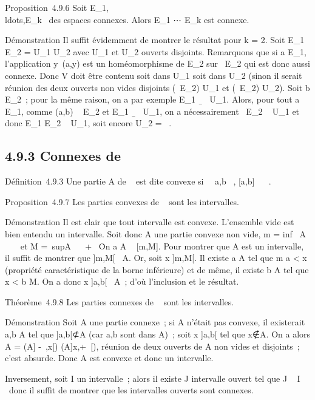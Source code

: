 \documentclass[]{article}
\begin{document}
Proposition~4.9.6 Soit
E_1,\\ldots,E_k~
des espaces connexes. Alors E_1 \times⋯ \times
E_k est connexe.

Démonstration Il suffit évidemment de montrer le résultat pour k = 2.
Soit E_1 \times E_2 = U_1 \cup U_2 avec
U_1 et U_2 ouverts disjoints. Remarquons que si a \in
E_1, l'application y\mapsto~(a,y) est un
homéomorphisme de E_2 sur \a\
\times E_2 qui est donc aussi connexe. Donc V doit être contenu soit
dans U_1 soit dans U_2 (sinon il serait réunion des
deux ouverts non vides disjoints (\a\
\times E_2) \bigcap U_1 et (\a\
\times E_2) \bigcap U_2). Soit b \in E_2~; pour la même
raison, on a par exemple E_1
\times\b\ \subset~ U_1. Alors, pour tout
a \in E_1, comme (a,b) \in\a\ \times
E_2 et E_1 \times\b\ \subset~
U_1, on a nécessairement \a\
\times E_2 \subset~ U_1 et donc E_1 \times E_2 \subset~
U_1, soit encore U_2 = \varnothing~.

\subsection{4.9.3 Connexes de ~}

Définition~4.9.3 Une partie A de ~ est dite convexe si
\forall~~a,b \in {}~, [a,b] \subset~ ~.

Proposition~4.9.7 Les parties convexes de ~ sont les intervalles.

Démonstration Il est clair que tout intervalle est convexe. L'ensemble
vide est bien entendu un intervalle. Soit donc A une partie convexe non
vide, m = inf~ A \in \mathbb{R}~
\cup\-\infty~\ et M =\
supA \in {}~ \cup\ + \infty~\. On a A \subset~
[m,M]. Pour montrer que A est un intervalle, il suffit de montrer
que ]m,M[\subset~ A. Or, soit x \in]m,M[. Il existe a \in A tel que m \leq a
< x (propriété caractéristique de la borne inférieure) et de
même, il existe b \in A tel que x < b \leq M. On a donc x
\in]a,b[\subset~ A~; d'où l'inclusion et le résultat.

Théorème~4.9.8 Les parties connexes de \mathbb{R}~ sont les intervalles.

Démonstration Soit A une partie connexe~; si A n'était pas convexe, il
existerait a,b \in A tel que ]a,b[⊄A (car a,b sont dans A)~; soit x
\in]a,b[ tel que x∉A. On a alors A = (A\bigcap]
-\infty~,x[) \cup (A\bigcap]x,+\infty~[), réunion de deux ouverts de A non vides et
disjoints~; c'est absurde. Donc A est convexe et donc un intervalle.

Inversement, soit I un intervalle~; alors il existe J intervalle ouvert
tel que J \subset~ I \subset~\overlineJ donc il suffit de montrer
que les intervalles ouverts sont connexes.
\end{document}
